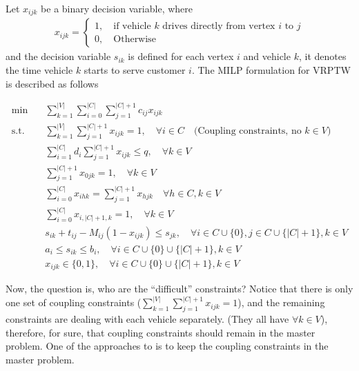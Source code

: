             Let $x_{ijk}$ be a binary decision variable, where
            \begin{align*}
                x_{ijk} = \begin{cases}
                    1, \quad \text{if vehicle $k$ drives directly from vertex $i$ to $j$}\\
                    0, \quad \text{Otherwise}
                \end{cases}
            \end{align*}
            and the decision variable $s_{ik}$ is defined for each vertex $i$ and vehicle $k$, it denotes the time vehicle $k$ starts to serve customer $i$. The MILP formulation for VRPTW is described as follows

            \begin{align*}
                \min \quad & \sum_{k = 1}^{|V|}\sum_{i = 0}^{|C|}\sum_{j = 1}^{|C| + 1} c_{ij} x_{ijk}\\
                \text{s.t.} \quad & \sum_{k = 1}^{|V|}\sum_{j = 1}^{|C| + 1} x_{ijk} = 1, \quad \forall i \in C \quad \text{(Coupling constraints, no $k \in V$)}\\
                & \sum_{i = 1}^{|C|} d_i \sum_{j = 1}^{|C| + 1} x_{ijk} \le q, \quad \forall k \in V \\
                & \sum_{j = 1}^{|C| + 1} x_{0jk} = 1, \quad \forall k \in V\\
                & \sum_{i = 0}^{|C|} x_{ihk} = \sum_{j = 1}^{|C| + 1} x_{hjk} \quad \forall h \in C, k \in V\\
                & \sum_{i = 0}^{|C|} x_{i, |C|+1, k} = 1, \quad \forall k \in V\\
                & s_{ik} + t_{ij} - M_{ij} (1 - x_{ijk}) \le s_{jk}, \quad \forall i \in C \cup \{0\}, j \in C \cup \{|C| + 1\}, k \in V\\
                & a_i \le s_{ik} \le b_i, \quad \forall i \in C \cup \{0\} \cup \{|C| + 1\}, k \in V\\
                & x_{ijk} \in \{0, 1\}, \quad \forall i \in C \cup \{0\} \cup \{|C| + 1\}, k \in V
            \end{align*}

            Now, the question is, who are the ``difficult'' constraints? Notice that there is only one set of coupling constraints ($\sum_{k = 1}^{|V|}\sum_{j = 1}^{|C| + 1} x_{ijk} = 1$), and the remaining constraints are dealing with each vehicle separately. (They all have $\forall k \in V$), therefore, for sure, that coupling constraints should remain in the master problem. One of the approaches to is to keep the coupling constraints in the master problem. 

